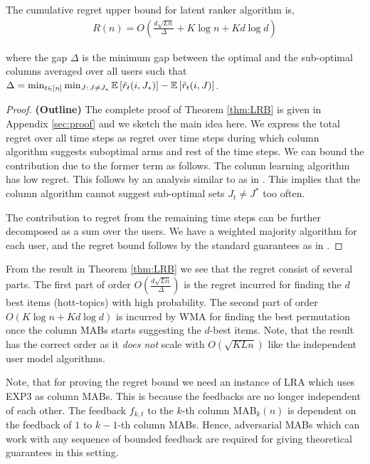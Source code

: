 

\begin{theorem}
\label{thm:LRB}
The cumulative regret upper bound for latent ranker algorithm is,
\begin{align*}
 R(n) = O\left(\frac{d \sqrt{L n}}{\Delta} + K \log n + K d \log d\right)
\end{align*}

where the gap $\Delta$ is the minimum gap between the optimal and the sub-optimal columns averaged over all users such that $\Delta =
  \min_{t \in [n]} \min_{J:\, J \neq J_\ast} \mathbb{E}\left[\tilde{r}_t(i, J_\ast)\right] - \mathbb{E}\left[\tilde{r}_t(i, J)\right]$.
\end{theorem}


\begin{proof} \textbf{(Outline)}
The complete proof of Theorem \ref{thm:LRB} is given in Appendix \ref{sec:proof} and we sketch the main idea here.  We  express the total regret over all time steps as regret over time steps during which column algorithm suggests suboptimal arms and rest of the time steps. We can bound the contribution due to the former term as follows. The column learning algorithm has  low regret. This follows by an analysis similar to as in \cite{radlinski2008learning}. This implies that the column algorithm cannot suggest sub-optimal sets $J_t \neq J^*$ too often. 

The contribution to regret from the remaining time steps can be further decomposed as a sum over the users. We have a weighted majority algorithm for each user, and the regret bound follows by the standard guarantees as in \citet{littlestone1994weighted}.
\end{proof}

\begin{discussion}
\label{disc:proof1}
From the result in Theorem \ref{thm:LRB} we see that the regret consist of several parts. The first part of order $O\left(\frac{d \sqrt{L n}}{\Delta} \right)$ is the regret incurred for finding the $d$ best items (hott-topics) with high probability. The second part of order $O\left( K\log n + K d \log d\right)$ is incurred by WMA for finding the best permutation once the column MABs starts suggesting the $d$-best items. Note, that the result has the correct order as it \textit{does not} scale with $O\left(\sqrt{KLn}\right)$ like the independent user model algorithms.
\end{discussion}

\begin{discussion}
\label{disc:proof2}
Note, that for proving the regret bound we need an instance of LRA which uses EXP3 \citep{auer2002finite} as column MABs. This is because the feedbacks are no longer independent of each other. The feedback $f_{k,t}$ to the $k$-th column MAB$_k(n)$  is dependent on the feedback of $1$ to $k-1$-th column MABs. Hence, adversarial MABs which can work with any sequence of bounded feedback are required for giving theoretical guarantees in this setting.
\end{discussion}
